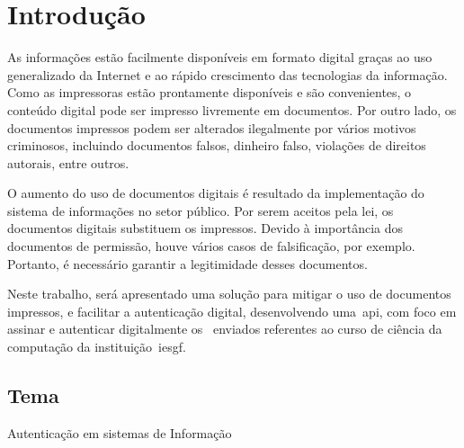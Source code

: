 \chapter{Introdução}\label{ch:introducao}

As informações estão facilmente disponíveis em formato digital graças ao uso
generalizado da Internet e ao rápido crescimento das tecnologias da informação.
Como as impressoras estão prontamente disponíveis e são convenientes, o conteúdo
digital pode ser impresso livremente em documentos.
Por outro lado, os documentos impressos podem ser alterados ilegalmente por
vários motivos criminosos, incluindo documentos falsos, dinheiro falso,
violações de direitos autorais, entre outros\cite{tsai2019}.

O aumento do uso de documentos digitais é resultado da implementação do
sistema de informações no setor público.
Por serem aceitos pela lei, os documentos digitais substituem os impressos.
Devido à importância dos documentos de permissão, houve vários casos de
falsificação, por exemplo.
Portanto, é necessário garantir a legitimidade desses documentos\cite{arief2019}.

Neste trabalho, será apresentado uma solução para mitigar o uso de documentos
impressos, e facilitar a autenticação digital, desenvolvendo uma~\acrfull{api},
com foco em assinar e autenticar digitalmente os~ enviados
referentes ao curso de ciência da computação da instituição~\acrlong{iesgf}.
\section{Tema}\label{sec:tema}
Autenticação em sistemas de Informação



